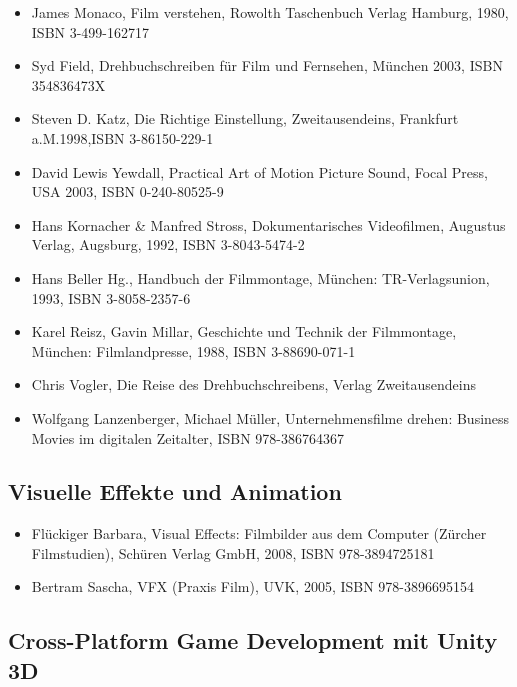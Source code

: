 \begin{itemize}
\item
  James Monaco, Film verstehen, Rowolth Taschenbuch Verlag Hamburg,
  1980, ISBN 3-499-162717
\item
  Syd Field, Drehbuchschreiben für Film und Fernsehen, München 2003,
  ISBN 354836473X
\item
  Steven D. Katz, Die Richtige Einstellung, Zweitausendeins, Frankfurt
  a.M.1998,ISBN 3-86150-229-1
\item
  David Lewis Yewdall, Practical Art of Motion Picture Sound, Focal
  Press, USA 2003, ISBN 0-240-80525-9
\item
  Hans Kornacher \& Manfred Stross, Dokumentarisches Videofilmen,
  Augustus Verlag, Augsburg, 1992, ISBN 3-8043-5474-2
\item
  Hans Beller Hg., Handbuch der Filmmontage, München: TR-Verlagsunion,
  1993, ISBN 3-8058-2357-6
\item
  Karel Reisz, Gavin Millar, Geschichte und Technik der Filmmontage,
  München: Filmlandpresse, 1988, ISBN 3-88690-071-1
\item
  Chris Vogler, Die Reise des Drehbuchschreibens, Verlag Zweitausendeins
\item
  Wolfgang Lanzenberger, Michael Müller, Unternehmensfilme drehen:
  Business Movies im digitalen Zeitalter, ISBN 978-386764367
\end{itemize}

\subsection*{Visuelle Effekte und
Animation}\label{visuelle-effekte-und-animation-3}

\begin{itemize}
\item
  Flückiger Barbara, Visual Effects: Filmbilder aus dem Computer
  (Zürcher Filmstudien), Schüren Verlag GmbH, 2008, ISBN 978-3894725181
\item
  Bertram Sascha, VFX (Praxis Film), UVK, 2005, ISBN 978-3896695154
\end{itemize}

\subsection*{Cross-Platform Game Development mit Unity
3D}\label{cross-platform-game-development-mit-unity-3d-3}

